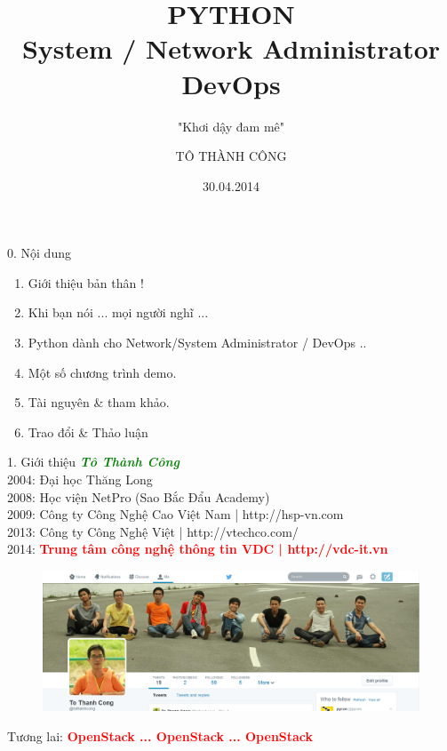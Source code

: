 \documentclass[10pt]{beamer}
\title[Python \& công việc]{PYTHON \\ System / Network Administrator \\ DevOps}
\subtitle[PYTHONVIETNAM]{"Khơi dậy đam mê"}
\author[Draft Version]{TÔ THÀNH CÔNG}
\institute[PYTHONVIETNAM.INFO]{
\label{Chu y tai lieu commnet 1}
  \texttt{tcvn1985@gmail.com}
}
\date{30.04.2014}
\newcommand\sFontvi{\fontsize{8}{7.2}\selectfont} %
\begin{document}
\begin{frame}[plain]
  \titlepage
\end{frame}

\label{Slide: Noi dung}
\begin{frame}{0. Nội dung}
	\begin{enumerate}
 	 	\item Giới thiệu bản thân !
  		\item Khi bạn nói ... mọi người nghĩ ...
  		\item Python dành cho Network/System Administrator / DevOps ..
  		\item Một số chương trình demo.
  		\item Tài nguyên \& tham khảo.
  		\item Trao đổi \& Thảo luận
  	\end{enumerate}  
\end{frame}
\label{Who}
\begin{frame}{1. Giới thiệu}
\sFontvi
\label{Chu y tai lieu commnet 2}
\textbf{\textit{\textcolor{green}{Tô Thành Công}}}\\
2004: Đại học Thăng Long \\
2008: Học viện NetPro (Sao Bắc Đẩu Academy)\\
2009: Công ty Công Nghệ Cao Việt Nam | http://hsp-vn.com \\
2013: Công ty Công Nghệ Việt | http://vtechco.com/ \\ 
2014: \textbf{\textcolor{red}{Trung tâm công nghệ thông tin VDC | http://vdc-it.vn }}
\begin{figure}[!ht]
\centering
			\includegraphics[scale=0.3]{congttwho}
\end{figure}
Tương lai: \Large{\textcolor{red}{\textbf{{OpenStack ... OpenStack ... OpenStack}}}}
\end{frame}
\end{document}

